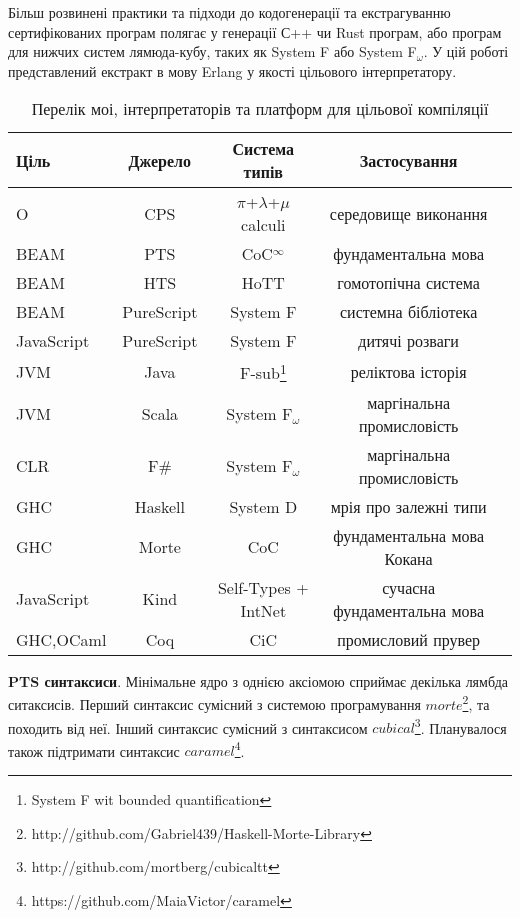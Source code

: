 Більш розвинені практики та підходи до кодогенерації та екстрагуванню
сертифікованих програм полягає у генерації С++ чи Rust програм, або програм
для нижчих систем лямюда-кубу, таких як System F або System F$_\omega$.
У цій роботі представлений екстракт в мову Erlang у якості цільового інтерпретатору.

\begin{table}[h]
\begin{center}
\caption{Перелік моі, інтерпретаторів та платформ для цільової компіляції}
\begin{tabular}{lcccc}
\hline
\textbf{Ціль} & \textbf{Джерело} & \textbf{Система типів} & \textbf{Застосування}\\
\hline
O          & CPS        & $\pi$+$\lambda$+$\mu$ calculi & середовище виконання \\
BEAM       & PTS        & CoC$^\infty$        & фундаментальна мова \\
BEAM       & HTS        & HoTT                & гомотопічна система \\
BEAM       & PureScript & System F            & системна бібліотека \\
\hline
JavaScript & PureScript & System F & дитячі розваги \\
JVM        & Java       & F-sub\footnote{System F wit bounded quantification} & реліктова історія \\
JVM        & Scala      & System F$_\omega$   & маргінальна промисловість \\
CLR        & F\#        & System F$_\omega$   & маргінальна промисловість \\
GHC        & Haskell    & System D            & мрія про залежні типи \\
GHC        & Morte      & CoC                 & фундаментальна мова Кокана \\
JavaScript & Kind       & Self-Types + IntNet & сучасна фундаментальна мова \\
GHC,OCaml  & Coq        & CiC                 & промисловий прувер \\
\hline
\end{tabular}
\end{center}
\end{table}

\textbf{PTS синтаксиси}. Мінімальне ядро з однією аксіомою
сприймає декілька лямбда ситаксисів.
Перший синтаксис сумісний з системою програмування
$morte$\footnote{http://github.com/Gabriel439/Haskell-Morte-Library}, та походить від неї.
Інший синтаксис сумісний з синтаксисом $cubical$\footnote{http://github.com/mortberg/cubicaltt}.
Планувалося також підтримати синтаксис $caramel$\footnote{https://github.com/MaiaVictor/caramel}.


